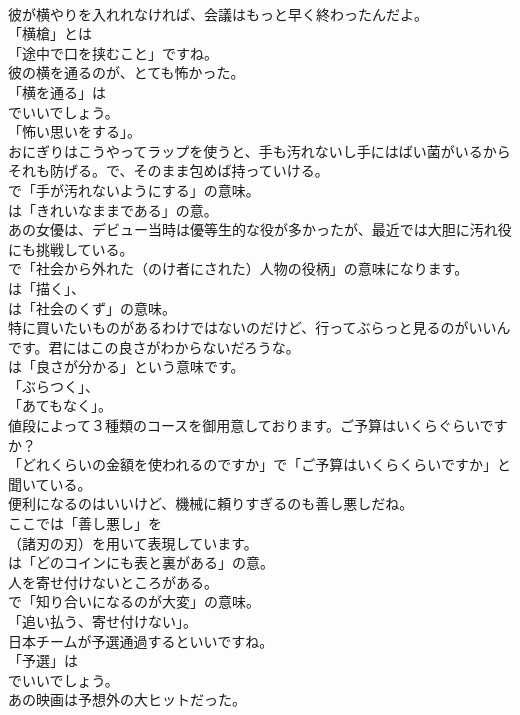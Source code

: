 \documentclass[8pt]{extreport}
\begin{document}
\begin{CJK}{UTF8}{min}
\\	彼が横やりを入れれなければ、会議はもっと早く終わったんだよ。 
\\	「横槍」とは
\\	「途中で口を挟むこと」ですね。	
\\	彼の横を通るのが、とても怖かった。 
\\	「横を通る」は
\\	でいいでしょう。
\\	「怖い思いをする」。	
\\	おにぎりはこうやってラップを使うと、手も汚れないし手にはばい菌がいるからそれも防げる。で、そのまま包めば持っていける。 
\\	で「手が汚れないようにする」の意味。
\\	は「きれいなままである」の意。	
\\	あの女優は、デビュー当時は優等生的な役が多かったが、最近では大胆に汚れ役にも挑戦している。 
\\	で「社会から外れた（のけ者にされた）人物の役柄」の意味になります。
\\	は「描く」、
\\	は「社会のくず」の意味。	
\\	特に買いたいものがあるわけではないのだけど、行ってぶらっと見るのがいいんです。君にはこの良さがわからないだろうな。 
\\	は「良さが分かる」という意味です。
\\	「ぶらつく」、
\\	「あてもなく」。	
\\	値段によって３種類のコースを御用意しております。ご予算はいくらぐらいですか？ 
\\	「どれくらいの金額を使われるのですか」で「ご予算はいくらくらいですか」と聞いている。	
\\	便利になるのはいいけど、機械に頼りすぎるのも善し悪しだね。 
\\	ここでは「善し悪し」を
\\	（諸刃の刃）を用いて表現しています。
\\	は「どのコインにも表と裏がある」の意。	
\\	人を寄せ付けないところがある。 
\\	で「知り合いになるのが大変」の意味。
\\	「追い払う、寄せ付けない」。	
\\	日本チームが予選通過するといいですね。 
\\	「予選」は 
\\	でいいでしょう。	
\\	あの映画は予想外の大ヒットだった。 

\end{CJK}
\end{document}
